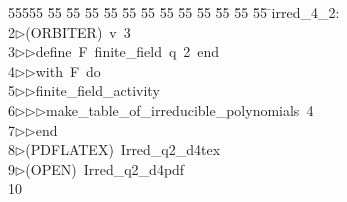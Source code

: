 %
%
\begin{tabbing}
55555 \= 55 \= 55 \= 55 \= 55 \= 55 \= 55 \= 55 \= 55 \= 55 \= 55 \= 55 \= 55 \= \>irred\_4\_2:\\[0pt]
2\>$\triangleright$\>(ORBITER)\ v\ 3\ \\[0pt]
3\>$\triangleright$\>$\triangleright$\>define\ F\ finite\_field\ q\ 2\ end\ \\[0pt]
4\>$\triangleright$\>$\triangleright$\>with\ F\ do\ \\[0pt]
5\>$\triangleright$\>$\triangleright$\>finite\_field\_activity\ \\[0pt]
6\>$\triangleright$\>$\triangleright$\>$\triangleright$\>make\_table\_of\_irreducible\_polynomials\ 4\ \\[0pt]
7\>$\triangleright$\>$\triangleright$\>end\\[0pt]
8\>$\triangleright$\>(PDFLATEX)\ Irred\_q2\_d4tex\\[0pt]
9\>$\triangleright$\>(OPEN)\ Irred\_q2\_d4pdf\\[0pt]
10\>\end{tabbing}
